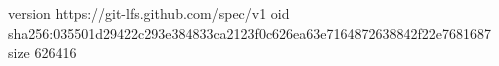 version https://git-lfs.github.com/spec/v1
oid sha256:035501d29422c293e384833ca2123f0c626ea63e7164872638842f22e7681687
size 626416
